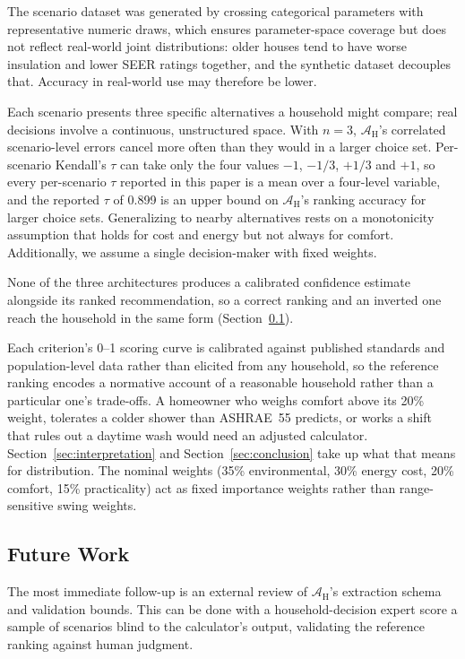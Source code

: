 \documentclass[final,3p,times]{elsarticle}
\begin{document}
The scenario dataset was generated by crossing categorical parameters with representative numeric draws, which ensures parameter-space coverage but does not reflect real-world joint distributions: older houses tend to have worse insulation and lower SEER ratings together, and the synthetic dataset decouples that. Accuracy in real-world use may therefore be lower.

Each scenario presents three specific alternatives a household might compare; real decisions involve a continuous, unstructured space. With $n=3$, $\mathcal{A}_{\text{H}}$'s correlated scenario-level errors cancel more often than they would in a larger choice set. Per-scenario Kendall's $\tau$ can take only the four values $-1$, $-1/3$, $+1/3$ and $+1$, so every per-scenario $\tau$ reported in this paper is a mean over a four-level variable, and the reported $\tau$ of 0.899 is an upper bound on $\mathcal{A}_{\text{H}}$'s ranking accuracy for larger choice sets. Generalizing to nearby alternatives rests on a monotonicity assumption that holds for cost and energy but not always for comfort. Additionally, we assume a single decision-maker with fixed weights. 

 None of the three architectures produces a calibrated confidence estimate alongside its ranked recommendation, so a correct ranking and an inverted one reach the household in the same form (Section~\ref{sec:futurework}).

Each criterion's 0--1 scoring curve is calibrated against published standards and population-level data rather than elicited from any household, so the reference ranking encodes a normative account of a reasonable household rather than a particular one's trade-offs. A homeowner who weighs comfort above its 20\% weight, tolerates a colder shower than ASHRAE~55 predicts, or works a shift that rules out a daytime wash would need an adjusted calculator. Section~\ref{sec:interpretation} and Section~\ref{sec:conclusion} take up what that means for distribution. The nominal weights (35\% environmental, 30\% energy cost, 20\% comfort, 15\% practicality) act as fixed importance weights rather than range-sensitive swing weights. 



\FloatBarrier
\subsection{Future Work}
\label{sec:futurework}
The most immediate follow-up is an external review of $\mathcal{A}_{\text{H}}$'s extraction schema and validation bounds. This can be done with a household-decision expert score a sample of scenarios blind to the calculator's output, validating the reference ranking against human judgment.
\end{document}

